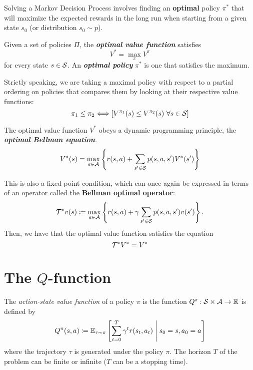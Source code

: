 \documentclass[../course-notes.tex]{subfiles}
\begin{document}
Solving a Markov Decision Process involves finding an \textbf{\bluefont optimal} policy $\pi^*$ that will maximize the expected rewards in the long run when starting from a given state $s_0$ (or distribution $s_0 \sim p$).

\begin{defn}
	Given a set of policies $\Pi$, the \emph{\bfseries\bluefont optimal value function} satisfies
	\begin{equation}
	V^* = \max_{\pi} V^{\pi}
	\end{equation}
	for every state $s \in \mathcal{S}$. An \emph{\bfseries\bluefont optimal policy} $\pi^*$ is one that satisfies the maximum.
\end{defn}

Strictly speaking, we are taking a maximal policy with respect to a partial ordering on policies that compares them by looking at their respective value functions:
\[
	\pi_1 \leq \pi_2 \Longleftrightarrow
	\left[
	V^{\pi_1}(s) \leq V^{\pi_2}(s)\ \forall s\in\mathcal{S}
	\right]
\]


\begin{prop}
	The optimal value function $V^*$ obeys a dynamic programming principle, the \emph{\bfseries\bluefont optimal Bellman equation}.
	\begin{equation}\label{eq:ValueOptimalBellmanEq}
	V^*(s) = \max_{a\in\mathcal{A}}
	\left\{
	r(s,a) + \sum_{s'\in\mathcal{S}} p(s,a,s')V^*(s')
	\right\}
	\end{equation}
\end{prop}


This is also a fixed-point condition, which can once again be expressed in terms of an operator called the \textbf{Bellman optimal operator}:
\[
\mathcal{T}^*v(s) \coloneqq
\max_{a\in\mathcal{A}} \left\{
r(s,a) + \gamma\sum_{s'\in\mathcal{S}}p(s,a,s')v(s')
\right\}.
\]
Then, we have that the optimal value function satisfies the equation
\[
\mathcal{T}^* V^* = V^*
\]


\section{The $Q$-function}



\begin{defn}
	The \textit{action-state value function} of a policy $\pi$ is the function $Q^\pi\colon \mathcal{S}\times\mathcal{A}\to \mathbb{R}$ is defined by
	\begin{equation}
	Q^\pi(s, a) \coloneqq \operatorname{\mathbb{E}}_{\tau\sim \pi}
	\left[
	\sum_{t=0}^T \gamma^t r(s_t, a_t) \;\middle|\; s_0 = s, a_0 = a
	\right]
	\end{equation}
	where the trajectory $\tau$ is generated under the policy $\pi$.
	The horizon $T$ of the problem can be finite or infinite ($T$ can be a stopping time).
\end{defn}
\end{document}
